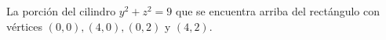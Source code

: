 \item La porción del cilindro $y^2 + z^2 = 9$ que se encuentra arriba del rectángulo con vértices $(0, 0), (4, 0), (0, 2)$ y $(4, 2)$.
